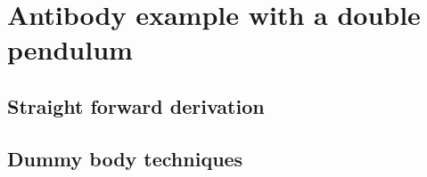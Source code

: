 \chapter{Antibody example with a double pendulum}
\label{app:AntiBody}
%
\section{Straight forward derivation}
%
\section{Dummy body techniques}
%